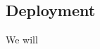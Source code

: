 \documentclass{article}[12pt]
\numberwithin{equation}{section}
\begin{document}
\begin{multicols*}{2}
\section{Deployment}
\begin{spacing}{1.5}
We will 
\end{spacing}










































\end{multicols*}












































\end{document}
